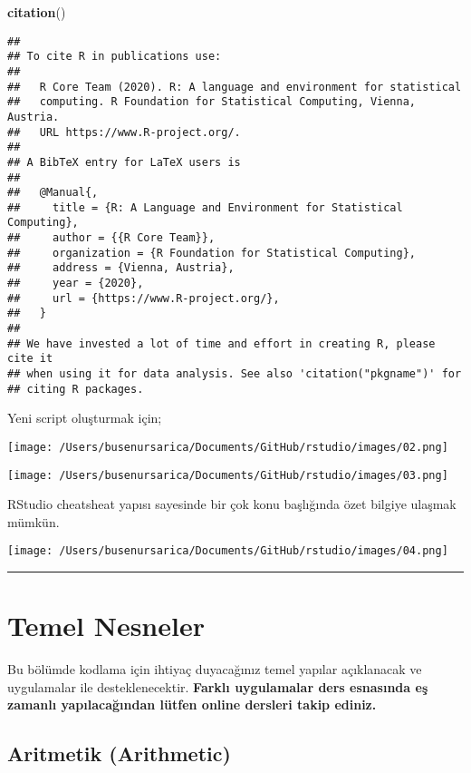 \documentclass[
]{book}
\newenvironment{Shaded}{\begin{snugshade}}{\end{snugshade}}
\newcommand{\KeywordTok}[1]{\textcolor[rgb]{0.13,0.29,0.53}{\textbf{#1}}}
\newcommand{\NormalTok}[1]{#1}
\begin{document}
\begin{Shaded}
\begin{Highlighting}[]
\KeywordTok{citation}\NormalTok{()}
\end{Highlighting}
\end{Shaded}

\begin{verbatim}
## 
## To cite R in publications use:
## 
##   R Core Team (2020). R: A language and environment for statistical
##   computing. R Foundation for Statistical Computing, Vienna, Austria.
##   URL https://www.R-project.org/.
## 
## A BibTeX entry for LaTeX users is
## 
##   @Manual{,
##     title = {R: A Language and Environment for Statistical Computing},
##     author = {{R Core Team}},
##     organization = {R Foundation for Statistical Computing},
##     address = {Vienna, Austria},
##     year = {2020},
##     url = {https://www.R-project.org/},
##   }
## 
## We have invested a lot of time and effort in creating R, please cite it
## when using it for data analysis. See also 'citation("pkgname")' for
## citing R packages.
\end{verbatim}

Yeni script oluşturmak için;

\texttt{[image: /Users/busenursarica/Documents/GitHub/rstudio/images/02.png]}

\texttt{[image: /Users/busenursarica/Documents/GitHub/rstudio/images/03.png]}

RStudio cheatsheat yapısı sayesinde bir çok konu başlığında özet bilgiye ulaşmak mümkün.

\texttt{[image: /Users/busenursarica/Documents/GitHub/rstudio/images/04.png]}

\begin{center}\rule{0.5\linewidth}{0.5pt}\end{center}

\hypertarget{temel-nesneler}{%
\chapter{Temel Nesneler}\label{temel-nesneler}}

Bu bölümde kodlama için ihtiyaç duyacağınız temel yapılar açıklanacak ve uygulamalar ile desteklenecektir. \textbf{Farklı uygulamalar ders esnasında eş zamanlı yapılacağından lütfen online dersleri takip ediniz.}

\hypertarget{aritmetik-arithmetic}{%
\section{Aritmetik (Arithmetic)}\label{aritmetik-arithmetic}}
\end{document}
